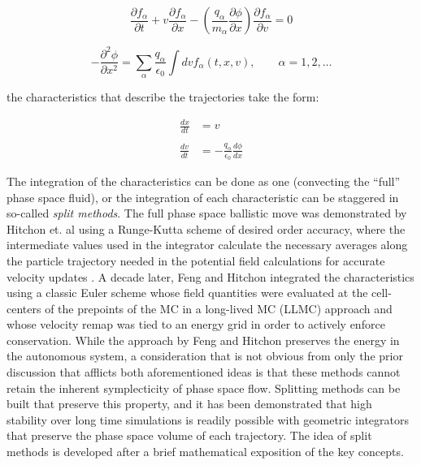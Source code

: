 \documentclass[11pt,titlepage]{report}
\begin{document}
\begin{equation}
\frac{\partial f_{\alpha}}{\partial t} + v\frac{\partial f_{\alpha}}{\partial x} - \left(\frac{q_{\alpha}}{m_{\alpha}}\frac{\partial\phi}{\partial x}\right)\frac{\partial f_{\alpha}}{\partial v} = 0 \label{eq:Vlasov_1D1V}\end{equation}

\begin{equation}-\frac{\partial^2 \phi}{\partial x^2} = \sum_{\alpha}\frac{q_{\alpha}}{\epsilon_0}\int dvf_{\alpha}(t,x,v), \qquad \alpha = 1,2,\ldots  \label{eq:Poisson_1D}
\end{equation}

\noindent the characteristics that describe the trajectories take the form:\vspace{-.7em}

\begin{subequations}
\begin{align}
\frac{dx}{dt} & =  v \label{eq:Vlasov_1D_dxdt}\\
&\nonumber\\
\frac{dv}{dt} & = -\frac{q_{\alpha}}{\epsilon_0}\frac{d\phi}{dx} \label{eq:Vlasov_1D_dvdt}
\end{align}
\end{subequations}


The integration of the characteristics can be done as one (convecting the ``full'' phase space fluid), or the integration of each characteristic can be staggered in so-called \emph{split methods}. The full phase space ballistic move was demonstrated by Hitchon et. al using a Runge-Kutta scheme of desired order accuracy, where the intermediate values used in the integrator calculate the necessary averages along the particle trajectory needed in the potential field calculations for accurate velocity updates \cite[p.84]{Hitchon89}. A decade later, Feng and Hitchon integrated the characteristics using a classic Euler scheme whose field quantities were evaluated at the cell-centers of the prepoints of the MC in a long-lived MC (LLMC) approach \cite{Feng99} and whose velocity remap was tied to an energy grid in order to actively enforce conservation. While the approach by Feng and Hitchon preserves the energy in the autonomous system, a consideration that is not obvious from only the prior discussion that afflicts both aforementioned ideas is that these methods cannot retain the inherent symplecticity of phase space flow. Splitting methods can be built that preserve this property, and it has been demonstrated that high stability over long time simulations is readily possible with geometric integrators that preserve the phase space volume of each trajectory. The idea of split methods is developed after a brief mathematical exposition of the key concepts.
\end{document}
